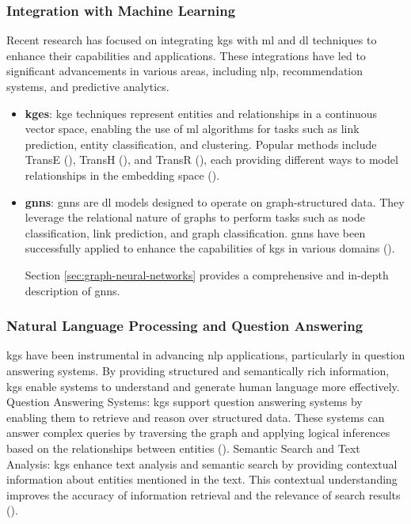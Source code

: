 \subsubsection*{Integration with Machine Learning}
Recent research has focused on integrating \glspl{kg} with \gls{ml} and \gls{dl} techniques to enhance their capabilities and applications. These integrations have led to significant advancements in various areas, including \gls{nlp}, recommendation systems, and predictive analytics.
\begin{itemize}
    \item \textbf{\glspl{kge}}: \gls{kge} techniques represent entities and relationships in a continuous vector space, enabling the use of \gls{ml} algorithms for tasks such as link prediction, entity classification, and clustering. Popular methods include TransE (\cite{Bordes2013}), TransH (\cite{Wang2014}), and TransR (\cite{Lin2015}), each providing different ways to model relationships in the embedding space (\cite{Wang2017}).
    \item \textbf{\glspl{gnn}}: \glspl{gnn} are \gls{dl} models designed to operate on graph-structured data. They leverage the relational nature of graphs to perform tasks such as node classification, link prediction, and graph classification. \glspl{gnn} have been successfully applied to enhance the capabilities of \glspl{kg} in various domains (\cite{Wu2021}).
    
    Section \ref{sec:graph-neural-networks} provides a comprehensive and in-depth description of \glspl{gnn}.
\end{itemize}

\subsubsection*{Natural Language Processing and Question Answering}
\glspl{kg} have been instrumental in advancing \gls{nlp} applications, particularly in question answering systems. By providing structured and semantically rich information, \glspl{kg} enable systems to understand and generate human language more effectively.
Question Answering Systems: \glspl{kg} support question answering systems by enabling them to retrieve and reason over structured data. These systems can answer complex queries by traversing the graph and applying logical inferences based on the relationships between entities (\cite{Yasunaga2021}).
Semantic Search and Text Analysis: \glspl{kg} enhance text analysis and semantic search by providing contextual information about entities mentioned in the text. This contextual understanding improves the accuracy of information retrieval and the relevance of search results (\cite{Fernandez2011}).

